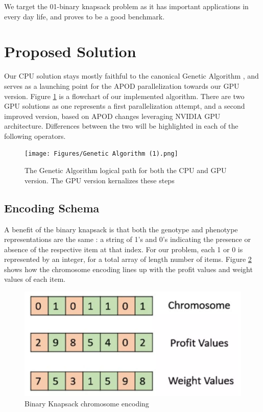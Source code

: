\documentclass[11pt]{article}       %
\begin{document}
We target the 01-binary knapsack problem as it has important applications in every day life, and proves to be a good benchmark.

\section{Proposed Solution} \label{propsol}
Our CPU solution stays mostly faithful to the canonical Genetic Algorithm \cite{holland1984genetic}, and serves as a launching point for the APOD parallelization towards our GPU version. Figure \ref{fig:GA} is a flowchart of our implemented algorithm. There are two GPU solutions as one represents a first parallelization attempt, and a second improved version, based on APOD changes leveraging NVIDIA GPU architecture. Differences between the two will be highlighted in each of the following operators.

\begin{figure}[h]
    \centering
    \texttt{[image: Figures/Genetic Algorithm (1).png]}
    \caption{The Genetic Algorithm logical path for both the CPU and GPU version. The GPU version kernalizes these steps}
    \label{fig:GA}
\end{figure}
\subsection{Encoding Schema}
A benefit of the binary knapsack is that both the genotype and phenotype representations are the same : a string of 1's and 0's indicating the presence or absence of the respective item at that index. For our problem, each 1 or 0 is represented by an integer, for a total array of length number of items. Figure \ref{fig:encoding} shows how the chromosome encoding lines up with the profit values and weight values of each item.

\begin{figure}[h]
    \centering
    \includegraphics[width=0.5\linewidth]{Figures/knapsack_representation.png}
    \caption{Binary Knapsack chromosome encoding}
    \label{fig:encoding}
\end{figure}
\end{document}
